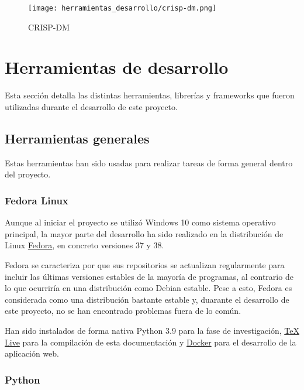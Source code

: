 \begin{figure}[!h]
      \centering
      \texttt{[image: herramientas\_desarrollo/crisp-dm.png]}
      \caption[CRISP-DM]{CRISP-DM \cite{wirth2000crisp}}\label{fig:herramientas_desarrollo/crisp-dm.png}
      \end{figure}
\FloatBarrier

\section{Herramientas de desarrollo}

Esta sección detalla las distintas herramientas, librerías y frameworks que
fueron utilizadas durante el desarrollo de este proyecto.

\subsection{Herramientas generales}

Estas herramientas han sido usadas para realizar tareas de forma general dentro
del proyecto.

\subsubsection{Fedora Linux}

Aunque al iniciar el proyecto se utilizó Windows 10 como sistema operativo
principal, la mayor parte del desarrollo ha sido realizado en la distribución de
Linux \href{https://fedoraproject.org/}{Fedora}, en concreto versiones 37 y 38.

Fedora se caracteriza por que sus repositorios se actualizan regularmente para
incluir las últimas versiones estables de la mayoría de programas, al contrario
de lo que ocurriría en una distribución como Debian estable. Pese a esto, Fedora
es considerada como una distribución bastante estable y, duarante el desarrollo
de este proyecto, no se han encontrado problemas fuera de lo común.

Han sido instalados de forma nativa Python 3.9 para la fase de investigación,
\href{https://www.tug.org/texlive/}{\TeX{} Live} para la compilación de esta
documentación y \href{https://www.docker.com/}{Docker} para el desarrollo de la
aplicación web.

\subsubsection{Python}

